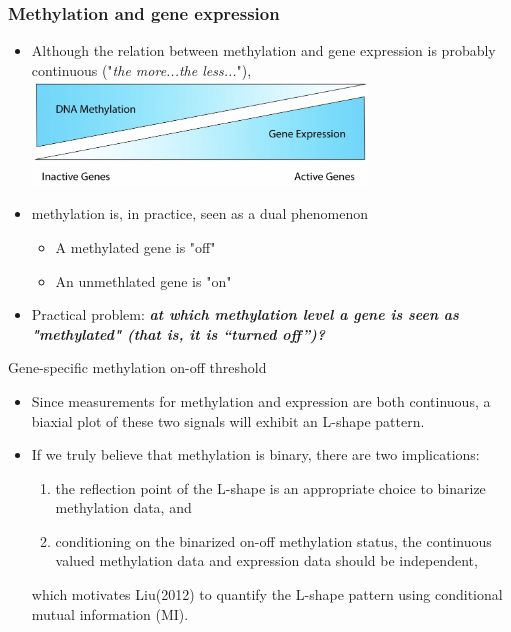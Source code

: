 \documentclass[handout]{beamer}
\begin{document}
\begin{frame}[fragile]\frametitle{Methylation and gene expression}
\label{sec-1.8}
\begin{itemize}
\item Although the relation between methylation and gene expression is probably continuous ("\emph{the more...the less...}"), 
\includegraphics[width=0.7\textwidth]{./images/DNA-Methylation-and-Gene-Expression-Relationship.jpg}
\item methylation is, in practice, seen as a dual phenomenon\\
\label{sec-1.8.3}
\begin{itemize}
\item A methylated gene is "off"\\
\label{sec-1.8.3.1}
\item An unmethlated gene is "on"\\
\label{sec-1.8.3.2}
\end{itemize} %
\item Practical problem: \textbf{\emph{at which methylation level a gene is seen as "methylated" (that is, it is ``turned off'')?}}
\label{sec-1.8.4}
\end{itemize} %

\end{frame}

\begin{frame}{Gene-specific methylation on-off threshold}
\begin{itemize}
\item Since measurements for methylation and expression are both
continuous, a biaxial plot of these two signals will exhibit an
L-shape pattern. 
\item If we truly
believe that methylation is binary, there are two implications:
\begin{enumerate}
\item the reflection point of the L-shape is an appropriate choice
to binarize methylation data, and
\item conditioning on the
binarized on-off methylation status, the continuous valued
methylation data and expression data should be independent,
\end{enumerate}
which motivates Liu(2012) to quantify the L-shape pattern using
conditional mutual information (MI). 
\end{itemize}
\end{frame}
\end{document}
